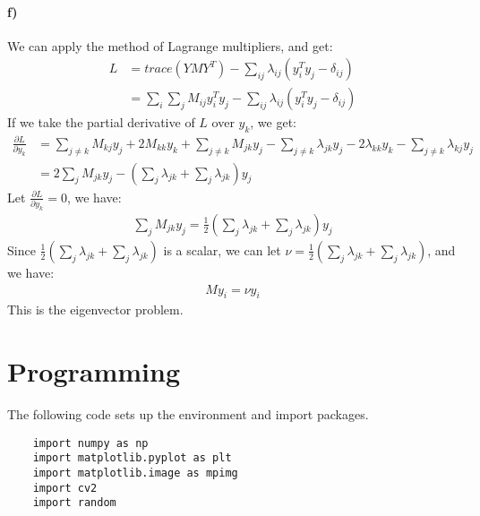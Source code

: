\documentclass{article}
\begin{document}
\paragraph{f)} We can apply the method of Lagrange multipliers, and get:
\begin{align*}
L &= trace(YMY^T) - \sum_{ij} \lambda_{ij} (y_i^Ty_j - \delta_{ij}) \\
&= \sum_i \sum_j M_{ij} y_i^T y_j - \sum_{ij} \lambda_{ij} (y_i^Ty_j - \delta_{ij})
\end{align*}
If we take the partial derivative of $L$ over $y_k$, we get:
\begin{align*}
\frac{\partial L}{\partial y_k} &=  \sum_{j \ne k} M_{kj} y_j + 2 M_{kk} y_k + \sum_{j \ne k} M_{jk} y_j - \sum_{j \ne k} \lambda_{jk} y_j - 2 \lambda_{kk} y_k - \sum_{j \ne k} \lambda_{kj} y_j \\
&= 2\sum_j M_{jk} y_j - (\sum_j \lambda_{jk} + \sum_j \lambda_{jk})y_j
\end{align*}
Let $\frac{\partial L}{\partial y_k} = 0$, we have:
\begin{align*}
\sum_j M_{jk} y_j = \frac{1}{2}(\sum_j \lambda_{jk} + \sum_j \lambda_{jk})y_j
\end{align*}
Since $\frac{1}{2}(\sum_j \lambda_{jk} + \sum_j \lambda_{jk})$ is a scalar, we can let $\nu = \frac{1}{2}(\sum_j \lambda_{jk} + \sum_j \lambda_{jk})$, and we have:
\begin{align*}
My_i = \nu y_i
\end{align*}
This is the eigenvector problem.

\newpage
\section{Programming}
The following code sets up the environment and import packages.
\begin{lstlisting}
	import numpy as np
	import matplotlib.pyplot as plt
	import matplotlib.image as mpimg
	import cv2
	import random
\end{lstlisting}
\end{document}
